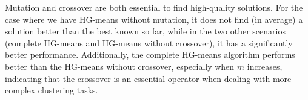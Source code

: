 \small{}

Mutation and crossover are both essential to find high-quality solutions. For the case where we have HG-means without mutation, it does not find (in average) a solution better than the best known so far, while in the two other scenarios (complete HG-means and HG-means without crossover), it has a significantly better performance. Additionally, the complete HG-means algorithm performs better than the HG-means without crossover, especially when $m$ increases, indicating that the crossover is an essential operator when dealing with more complex clustering tasks.

